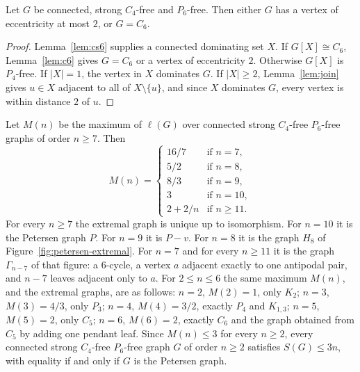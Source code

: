 \documentclass[ASNA]{USG}
\theoremstyle{WBstyletwo}
\numberwithin{equation}{section}
\newcommand{\lr}{\ell}
\begin{document}
\begin{lemma}\label{lem:ecc2}
Let $G$ be connected, strong $C_4$-free and $P_6$-free. Then either $G$ has a vertex of eccentricity at most $2$, or $G=C_6$.
\end{lemma}

\begin{proof}
Lemma~\ref{lem:cs6} supplies a connected dominating set $X$. If $G[X]\cong C_6$, Lemma~\ref{lem:c6} gives $G=C_6$ or a vertex of eccentricity $2$. Otherwise $G[X]$ is $P_4$-free. If $|X|=1$, the vertex in $X$ dominates $G$. If $|X|\ge 2$, Lemma~\ref{lem:join} gives $u\in X$ adjacent to all of $X\setminus\{u\}$, and since $X$ dominates $G$, every vertex is within distance $2$ of $u$.
\end{proof}

\begin{theorem}\label{thm:petersen}\label{prop:gap}
Let $M(n)$ be the maximum of $\lr(G)$ over connected strong $C_4$-free $P_6$-free graphs of order $n\ge 7$. Then
\[
M(n)=\begin{cases}
16/7 & \text{if }n=7,\\
5/2 & \text{if }n=8,\\
8/3 & \text{if }n=9,\\
3 & \text{if }n=10,\\
2+2/n & \text{if }n\ge 11.
\end{cases}
\]
For every $n\ge 7$ the extremal graph is unique up to isomorphism. For $n=10$ it is the Petersen graph $P$. For $n=9$ it is $P-v$. For $n=8$ it is the graph $H_8$ of Figure~\ref{fig:petersen-extremal}. For $n=7$ and for every $n\ge 11$ it is the graph $\Gamma_{n-7}$ of that figure: a $6$-cycle, a vertex $a$ adjacent exactly to one antipodal pair, and $n-7$ leaves adjacent only to $a$. For $2\le n\le 6$ the same maximum $M(n)$, and the extremal graphs, are as follows: $n=2$, $M(2)=1$, only $K_2$; $n=3$, $M(3)=4/3$, only $P_3$; $n=4$, $M(4)=3/2$, exactly $P_4$ and $K_{1,3}$; $n=5$, $M(5)=2$, only $C_5$; $n=6$, $M(6)=2$, exactly $C_6$ and the graph obtained from $C_5$ by adding one pendant leaf. Since $M(n)\le 3$ for every $n\ge 2$, every connected strong $C_4$-free $P_6$-free graph $G$ of order $n\ge 2$ satisfies $S(G)\le 3n$, with equality if and only if $G$ is the Petersen graph.
\end{theorem}
\end{document}
